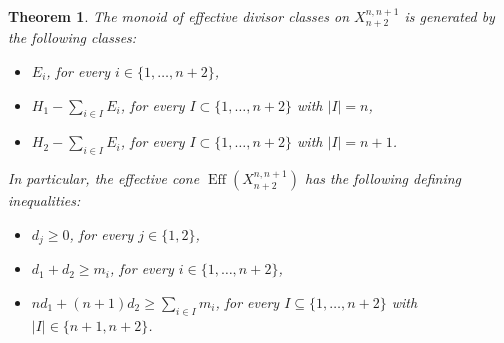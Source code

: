 \documentclass[a4paper,11pt]{article}
\newtheorem{theorem}{Theorem}[section]
\newcommand{\Eff}{\operatorname{Eff}}
\begin{document}
\begin{theorem}\label{eff-cone-n+2}
The monoid of effective divisor classes on $X^{n,n+1}_{n+2}$ is generated by the following classes:
\begin{itemize}
\item[($G_0$)] $E_i$,  for every $i\in\{1,\dots, n+2\}$,
\item[($G_1$)] $H_1-\sum_{i\in I}E_i$, for every $I\subset \{1,\dots, n+2\}$ with $|I|=n$,
\item[($G_2$)] $H_2-\sum_{i\in I}E_i$, for every $I\subset \{1,\dots, n+2\}$ with $|I|=n+1$.
\end{itemize}
In particular, the effective cone $\Eff(X^{n,n+1}_{n+2})$ has the following defining inequalities:
\begin{itemize}
\item[($\mathcal{I}_0$)] $d_j\ge0$, for every $j\in\{1,2\}$, 
\item[($\mathcal{I}_1$)]  $d_1+d_2\ge m_i$, for every $i\in\{1,\dots, n+2\}$,
\item[($\mathcal{I}_2$)]  $nd_1+(n+1)d_2\ge \sum_{i\in I}m_i$, for every $I\subseteq \{1,\dots, n+2\}$ with $|I|\in\{n+1,n+2\}$.
\end{itemize}
\end{theorem}
\end{document}

